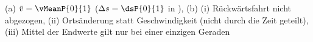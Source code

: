 (a) $\bar v = \vMeanP{0}{1}$ ($\Delta s = \dsP{0}{1}$ in \tEO), (b) (i) Rückwärtsfahrt nicht abgezogen, (ii) Ortsänderung statt Geschwindigkeit (nicht durch die Zeit geteilt), (iii) Mittel der Endwerte gilt nur bei einer einzigen Geraden
